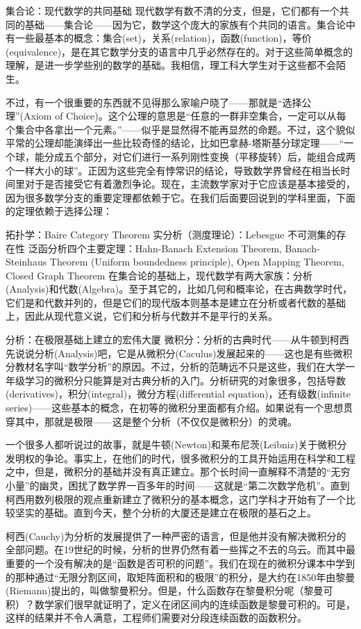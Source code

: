 集合论：现代数学的共同基础
现代数学有数不清的分支，但是，它们都有一个共同的基础——集合论——因为它，数学这个庞大的家族有个共同的语言。集合论中有一些最基本的概念：集合(set)，关系(relation)，函数(function)，等价(equivalence)，是在其它数学分支的语言中几乎必然存在的。对于这些简单概念的理解，是进一步学些别的数学的基础。我相信，理工科大学生对于这些都不会陌生。

不过，有一个很重要的东西就不见得那么家喻户晓了——那就是“选择公理”(Axiom of Choice)。这个公理的意思是“任意的一群非空集合，一定可以从每个集合中各拿出一个元素。”——似乎是显然得不能再显然的命题。不过，这个貌似平常的公理却能演绎出一些比较奇怪的结论，比如巴拿赫-塔斯基分球定理——“一个球，能分成五个部分，对它们进行一系列刚性变换（平移旋转）后，能组合成两个一样大小的球”。正因为这些完全有悖常识的结论，导致数学界曾经在相当长时间里对于是否接受它有着激烈争论。现在，主流数学家对于它应该是基本接受的，因为很多数学分支的重要定理都依赖于它。在我们后面要回说到的学科里面，下面的定理依赖于选择公理：

拓扑学：Baire Category Theorem
实分析（测度理论）：Lebesgue 不可测集的存在性
泛函分析四个主要定理：Hahn-Banach Extension Theorem, Banach-Steinhaus Theorem (Uniform boundedness principle), Open Mapping Theorem, Closed Graph Theorem
在集合论的基础上，现代数学有两大家族：分析(Analysis)和代数(Algebra)。至于其它的，比如几何和概率论，在古典数学时代，它们是和代数并列的，但是它们的现代版本则基本是建立在分析或者代数的基础上，因此从现代意义说，它们和分析与代数并不是平行的关系。

 
分析：在极限基础上建立的宏伟大厦
微积分：分析的古典时代——从牛顿到柯西
先说说分析(Analysis)吧，它是从微积分(Caculus)发展起来的——这也是有些微积分教材名字叫“数学分析”的原因。不过，分析的范畴远不只是这些，我们在大学一年级学习的微积分只能算是对古典分析的入门。分析研究的对象很多，包括导数(derivatives)，积分(integral)，微分方程(differential equation)，还有级数(infinite series)——这些基本的概念，在初等的微积分里面都有介绍。如果说有一个思想贯穿其中，那就是极限——这是整个分析（不仅仅是微积分）的灵魂。

一个很多人都听说过的故事，就是牛顿(Newton)和莱布尼茨(Leibniz)关于微积分发明权的争论。事实上，在他们的时代，很多微积分的工具开始运用在科学和工程之中，但是，微积分的基础并没有真正建立。那个长时间一直解释不清楚的“无穷小量”的幽灵，困扰了数学界一百多年的时间——这就是“第二次数学危机”。直到柯西用数列极限的观点重新建立了微积分的基本概念，这门学科才开始有了一个比较坚实的基础。直到今天，整个分析的大厦还是建立在极限的基石之上。

柯西(Cauchy)为分析的发展提供了一种严密的语言，但是他并没有解决微积分的全部问题。在19世纪的时候，分析的世界仍然有着一些挥之不去的乌云。而其中最重要的一个没有解决的是“函数是否可积的问题”。我们在现在的微积分课本中学到的那种通过“无限分割区间，取矩阵面积和的极限”的积分，是大约在1850年由黎曼(Riemann)提出的，叫做黎曼积分。但是，什么函数存在黎曼积分呢（黎曼可积）？数学家们很早就证明了，定义在闭区间内的连续函数是黎曼可积的。可是，这样的结果并不令人满意，工程师们需要对分段连续函数的函数积分。


